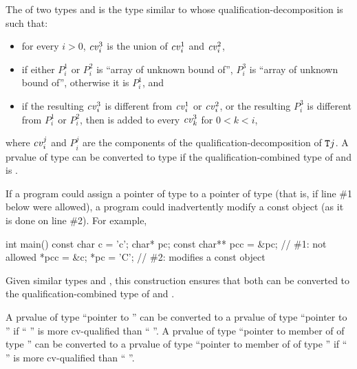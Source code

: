 \pnum
The  of two types  and 
is the type 
similar to  whose qualification-decomposition is such that:
\begin{itemize}
\item
for every $i > 0$, $\cv{}^3_i$ is the union of
$\cv{}^1_i$ and $\cv{}^2_i$,
\item
if either $P^1_i$ or $P^2_i$ is ``array of unknown bound of'',
$P^3_i$ is ``array of unknown bound of'', otherwise it is $P^1_i$, and
\item
if the resulting $\cv{}^3_i$ is different from $\cv{}^1_i$ or $\cv{}^2_i$,
or the resulting $P^3_i$ is different from $P^1_i$ or $P^2_i$,
then  is added to every $\cv{}^3_k$ for $0 < k < i$,
\end{itemize}
where $\cv{}^j_i$ and $P^j_i$ are the components of
the qualification-decomposition of $\texttt{\protect T}j$.
A prvalue of type 
can be converted to type 
if the qualification-combined type of  and  is .
\begin{note}
If a program could assign a pointer of type  to a pointer of
type   (that is, if line \#1 below were
allowed), a program could inadvertently modify a const object
(as it is done on line \#2). For example,
\begin{codeblock}
int main() {
  const char c = 'c';
  char* pc;
  const char** pcc = &pc;       // \#1: not allowed
  *pcc = &c;
  *pc = 'C';                    // \#2: modifies a const object
}
\end{codeblock}
\end{note}
\begin{note}
Given similar types  and , this
construction ensures that
both can be converted to the qualification-combined type of  and .
\end{note}

\pnum
\begin{note}
A prvalue of type ``pointer to  '' can be
converted to a prvalue of type ``pointer to  '' if
`` '' is more cv-qualified than ``
''.
A prvalue of type ``pointer to member of  of type 
'' can be converted to a prvalue of type ``pointer to member
of  of type  '' if ``
'' is more cv-qualified than `` ''.
\end{note}

